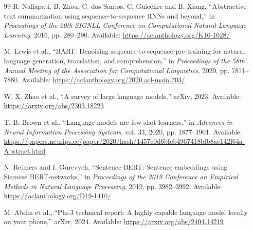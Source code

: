 \documentclass[11pt,a4paper]{article}
\begin{document}
\begin{thebibliography}{99}
R. Nallapati, B. Zhou, C. dos Santos, C. Gulcehre and B. Xiang, ``Abstractive text summarization using sequence-to-sequence RNNs and beyond,'' in \textit{Proceedings of the 20th SIGNLL Conference on Computational Natural Language Learning}, 2016, pp. 280--290. Available: \url{https://aclanthology.org/K16-1028/}

M. Lewis et al., ``BART: Denoising sequence-to-sequence pre-training for natural language generation, translation, and comprehension,'' in \textit{Proceedings of the 58th Annual Meeting of the Association for Computational Linguistics}, 2020, pp. 7871--7880. Available: \url{https://aclanthology.org/2020.acl-main.703/}

W. X. Zhao et al., ``A survey of large language models,'' arXiv, 2023. Available: \url{https://arxiv.org/abs/2303.18223}

T. B. Brown et al., ``Language models are few-shot learners,'' in \textit{Advances in Neural Information Processing Systems}, vol. 33, 2020, pp. 1877--1901. Available: \url{https://papers.neurips.cc/paper/2020/hash/1457c0d6bfcb4967418bfb8ac142f64a-Abstract.html}

N. Reimers and I. Gurevych, ``Sentence-BERT: Sentence embeddings using Siamese BERT-networks,'' in \textit{Proceedings of the 2019 Conference on Empirical Methods in Natural Language Processing}, 2019, pp. 3982--3992. Available: \url{https://aclanthology.org/D19-1410/}

M. Abdin et al., ``Phi-3 technical report: A highly capable language model locally on your phone,'' arXiv, 2024. Available: \url{https://arxiv.org/abs/2404.14219}

\end{thebibliography}
\end{document}
